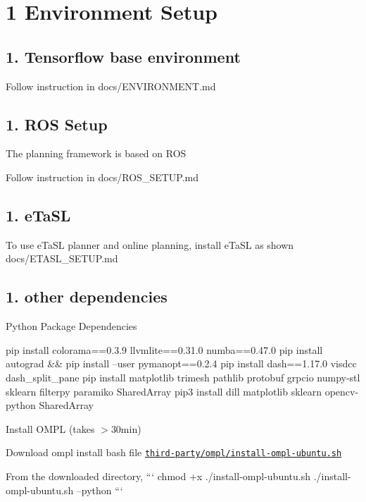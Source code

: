 \section*{1 Environment Setup}

\subsection*{1. Tensorflow base environment}


\begin{DoxyItemize}
\item Follow instruction in docs/\+E\+N\+V\+I\+R\+O\+N\+M\+E\+NT.md
\end{DoxyItemize}

\subsection*{1. R\+OS Setup}


\begin{DoxyItemize}
\item The planning framework is based on R\+OS
\item Follow instruction in docs/\+R\+O\+S\+\_\+\+S\+E\+T\+UP.md
\end{DoxyItemize}

\subsection*{1. e\+Ta\+SL}


\begin{DoxyItemize}
\item To use e\+Ta\+SL planner and online planning, install e\+Ta\+SL as shown docs/\+E\+T\+A\+S\+L\+\_\+\+S\+E\+T\+UP.md
\end{DoxyItemize}

\subsection*{1. other dependencies}


\begin{DoxyItemize}
\item Python Package Dependencies 
\begin{DoxyCode}
pip install colorama==0.3.9 llvmlite==0.31.0 numba==0.47.0
pip install autograd && pip install --user pymanopt==0.2.4
pip install dash==1.17.0 visdcc dash\_split\_pane
pip install matplotlib trimesh pathlib protobuf grpcio numpy-stl sklearn filterpy paramiko SharedArray  
pip3 install dill matplotlib sklearn opencv-python SharedArray  
\end{DoxyCode}

\item Install O\+M\+PL (takes $>$30min)
\begin{DoxyItemize}
\item Download ompl install bash file \href{third-party/ompl/install-ompl-ubuntu.sh}{\tt third-\/party/ompl/install-\/ompl-\/ubuntu.\+sh}
\item From the downloaded directory, ``` chmod +x ./install-\/ompl-\/ubuntu.sh ./install-\/ompl-\/ubuntu.sh --python ```
\end{DoxyItemize}
\end{DoxyItemize}

